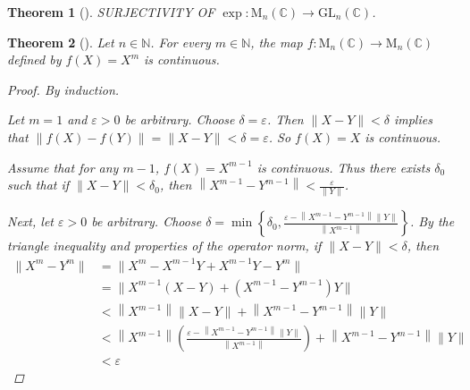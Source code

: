 \documentclass[letterpaper, 10pt]{article}
\theoremstyle{theostyle}
\newtheorem{theorem}{Theorem}[section]
\newenvironment{thmstyle}[1][]{%
    \begin{theorem}[#1]\leavevmode\vspace{-\baselineskip}\myquote%
    }{\endmyquote\end{theorem}}
\begin{document}
\begin{thmstyle}
    SURJECTIVITY OF \(\exp : \mathrm{M}_n (\mathbb{C}) \rightarrow \mathrm{GL}_n (\mathbb{C})\).
\end{thmstyle}

\begin{thmstyle}
    Let \(n \in \mathbb{N}\).
    For every \(m \in \mathbb{N}\), the map \(f: \mathrm{M}_n(\mathbb{C}) \rightarrow \mathrm{M}_n(\mathbb{C})\) defined by \(f(X) = X^m\) is continuous.

    \begin{proof}
        By induction.


        Let \(m = 1\) and \(\varepsilon > 0 \) be arbitrary.
        Choose \(\delta = \varepsilon\).
        Then \(\lVert X - Y \rVert < \delta\) implies that \(\lVert f(X) - f(Y) \rVert = \lVert X - Y \rVert < \delta = \varepsilon\).
        So \(f(X) = X\) is continuous.


        Assume that for any \(m-1\), \(f(X) = X^{m-1}\) is continuous.
        Thus there exists \(\delta_0\) such that if \(\lVert X - Y \rVert < \delta_0\), then \(\left\lVert X^{m-1} - Y^{m-1} \right\rVert < \frac{\varepsilon}{\lVert Y \rVert}\).
        
        
        Next, let \(\varepsilon > 0\) be arbitrary.
        Choose \(\delta = \min \left\{\delta_0 , \frac{\varepsilon - \left\lVert X^{m-1} - Y^{m-1} \right\rVert \lVert Y \rVert}{\left\lVert X^{m-1}\right\rVert} \right\}\).
        By the triangle inequality and properties of the operator norm, if \(\lVert X - Y \rVert < \delta\), then
        \begin{align*}
            \lVert X^m - Y^m \rVert  &= \lVert X^m - X^{m-1} Y + X^{m-1} Y - Y^m \rVert \\
            &= \lVert X^{m-1} \left(X - Y \right) + \left(X^{m-1} - Y^{m-1}\right) Y \rVert \\
            &< \left\lVert X^{m-1} \right\rVert \lVert X - Y \rVert + \left\lVert X^{m-1} - Y^{m-1} \right\rVert \lVert Y \rVert \\
            &< \left\lVert X^{m-1} \right\rVert  \left( \frac{\varepsilon - \left\lVert X^{m-1} - Y^{m-1} \right\rVert \lVert Y \rVert}{\left\lVert X^{m-1}\right\rVert}\right) + \left\lVert X^{m-1} - Y^{m-1} \right\rVert \lVert Y \rVert \\
            &< \varepsilon
        \end{align*}
    \end{proof}
\end{thmstyle}
\end{document}
